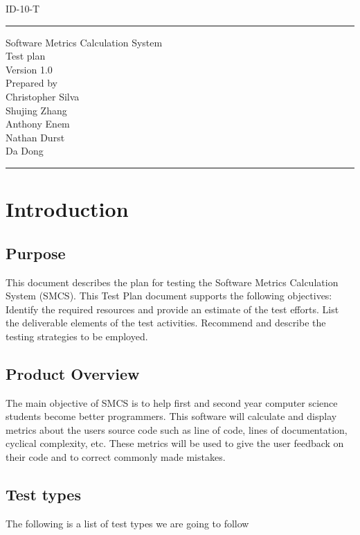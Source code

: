 \documentclass{scrreprt}
\author{Christopher Silva}
\date{}
\def\myversion{1.0 }
\begin{document}
	\begin{titlepage}
		\flushright
		\LARGE{ID-10-T}
		\rule{16cm}{5pt}\vskip1cm
		\centering
		\Huge{Software Metrics Calculation System}\\
		\vspace{2cm}
		\Huge{Test plan}\\
		\vspace{2cm}
		\LARGE{Version \myversion\\}
		\vspace{2cm}
		Prepared by\\
	    Christopher Silva\\
	    Shujing Zhang\\
		Anthony Enem\\
		Nathan Durst\\
		Da Dong\\
		\vfill
		\rule{16cm}{5pt}
	\end{titlepage}
	\tableofcontents
	{\let\clearpage\relax \chapter{Introduction}}
	
	\section{Purpose}
	This document describes the plan for testing the Software Metrics Calculation System (SMCS). This Test Plan document supports the following objectives:
	Identify the required resources and provide an estimate of the test efforts.
	List the deliverable elements of the test activities.
	Recommend and describe the testing strategies to be employed.

	\section{Product Overview}
	The main objective of SMCS is to help first and second year computer science students become better programmers.
	This software will calculate and display metrics about the users source code such as line of code, lines of documentation, cyclical complexity, etc.
	These metrics will be used to give the user feedback on their code and to correct commonly made mistakes.
	
	\section{Test types}
	The following is a list of test types we are going to follow
\end{document}
